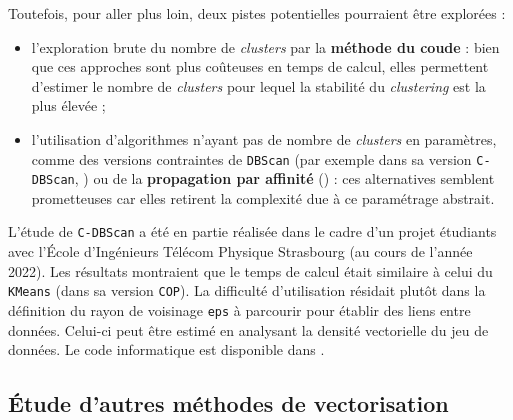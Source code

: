 		Toutefois, pour aller plus loin, deux pistes potentielles pourraient être explorées :
		\begin{itemize}
			\item l'exploration brute du nombre de \textit{clusters} par la \textbf{méthode du coude} : bien que ces approches sont plus coûteuses en temps de calcul, elles permettent d'estimer le nombre de \textit{clusters} pour lequel la stabilité du \textit{clustering} est la plus élevée ;
			\item l'utilisation d'algorithmes n'ayant pas de nombre de \textit{clusters} en paramètres, comme des versions contraintes de \texttt{DBScan} (par exemple dans sa version \texttt{C-DBScan}, \cite{ruiz-etal:2010:densitybased-semisupervised-clustering}) ou de la \textbf{propagation par affinité} (\cite{givoni-frey:2009:semisupervised-affinity-propagation}) : ces alternatives semblent prometteuses car elles retirent la complexité due à ce paramétrage abstrait.
		\end{itemize}
		
		\setcounter{localCounterOfFootnoteValue}{\value{footnote}}
		\begin{leftBarInformation}
			L'étude de \texttt{C-DBScan} a été en partie réalisée dans le cadre d'un projet étudiants avec l'École d'Ingénieurs Télécom Physique Strasbourg (au cours de l'année 2022).
			Les résultats montraient que le temps de calcul était similaire à celui du \texttt{KMeans} (dans sa version \texttt{COP}).
			La difficulté d'utilisation résidait plutôt dans la définition du rayon de voisinage \texttt{eps} à parcourir pour établir des liens entre données.
			Celui-ci peut être estimé en analysant la densité vectorielle du jeu de données.
			Le code informatique est disponible dans \cite{schild:2022:cognitivefactory-interactiveclustering} \footnotemark.
		\end{leftBarInformation}
	
	
	\subsection{Étude d'autres méthodes de vectorisation}
	\label{section:4.7.2-HYPOTHESES-NON-VERIFIEES-VECTORISATION}
	

